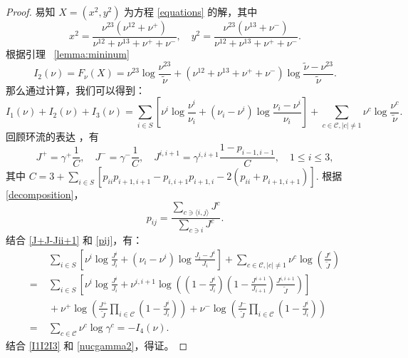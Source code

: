 \begin{proof}
	易知 $X=(x^2,y^2)$ 为方程 \eqref{equations} 的解，其中
\begin{equation*}
	x^{2}=\frac{\nu^{23}\left(\nu^{12}+\nu^+\right)}{\nu^{12}+\nu^{13}+\nu^++\nu^-},\quad y^{2}=\frac{\nu^{23}\left(\nu^{13}+\nu^-\right)}{\nu^{12}+\nu^{13}+\nu^++\nu^-}.
\end{equation*}
根据引理 ~\ref{lemma:mininum}
\begin{equation*}\label{Fnu2}
I_2(\nu)=F_{\nu}(X)=\nu^{23}\log\frac{\nu^{23}}{\tilde{\nu}}+\left(\nu^{12}+\nu^{13}+\nu^++\nu^-\right)\log\frac{\tilde{\nu}-\nu^{23}}{\tilde{\nu}}.
\end{equation*}
那么通过计算，我们可以得到：
\begin{equation}\label{I1I2I3}
	I_1(\nu)+I_2(\nu)+I_3(\nu) = \sum_{i\in S} \left[\nu^{i}\log \frac{\nu^{i}}{\nu_i} + (\nu_i - \nu^i)\log \frac{\nu_i - \nu^i}{\nu_i} 
	\right]
	+ \sum_{c \in \mathcal{C}, |c|\neq 1} \nu^{c} \log \frac{\nu^{c}}{\tilde{\nu}}.
\end{equation}
回顾环流的表达 \cite[Theorem.1.3.3]{jiang2004mathematical}，有
\begin{equation}\label{J+J-Jii+1}
J^+=\gamma^+\frac{1}{C},\quad J^-=\gamma^-\frac{1}{C},\quad J^{i,i+1}=\gamma^{i,i+1}\frac{1-p_{i-1,i-1}}{C}, \quad 1\le i\le 3,
\end{equation}
其中 $C=3+\sum_{i\in S}[p_{ii}p_{i+1,i+1}-p_{i,i+1}p_{i+1,i}-2(p_{ii}+p_{i+1,i+1})]$. 根据 \eqref{decomposition}，
\begin{equation}\label{pij}
	p_{ij}=\frac{\sum_{c \ni \langle i,j\rangle}J^c}{\sum_{c\ni i}J^c}.
\end{equation}
结合 \eqref{J+J-Jii+1} 和 \eqref{pij}，有：
\begin{equation}\label{nucgamma2}
	\begin{split}
		&\;\sum_{i \in S}\left[\nu^i\log\frac{J^i}{J_i}+\left(\nu_i-\nu^i\right)\log\frac{J_i-J^i}{J_i}\right]+ \sum_{c \in \mathcal{C}, |c|\neq 1} \nu^{c} \log \left(\frac{J^c}{\tilde{J}}\right)\\
		=&\;\sum_{i \in S}\left[\nu^i\log\frac{J^i}{J_i}+\nu^{i,i+1}\log\left(\left(1-\frac{J^i}{J_i}\right)\left(1-\frac{J^{i+1}}{J_{i+1}}\right)\frac{J^{i,i+1}}{\tilde{J}}\right)\right]\\
		&\;+\nu^+\log\left(\frac{J^+}{\tilde{J}}\prod_{i\in\mathcal{C}}\left(1-\frac{J^i}{J_i}\right)\right)+\nu^-\log\left(\frac{J^-}{\tilde{J}}\prod_{i\in\mathcal{C}}\left(1-\frac{J^i}{J_i}\right)\right)\\
		=&\;\sum_{c \in \mathcal{C}}\nu^c \log\gamma^c=-I_4(\nu).
	\end{split}
\end{equation}
结合 \eqref{I1I2I3} 和 \eqref{nucgamma2}，得证。
\end{proof}

